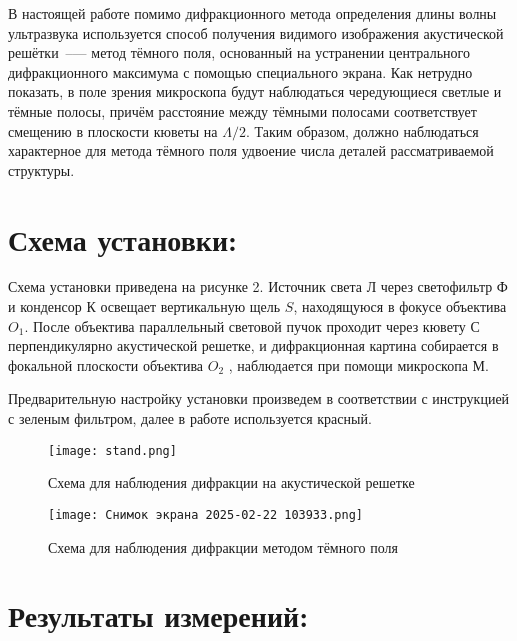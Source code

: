\documentclass[a4paper, 12pt]{article}
\begin{document}
В настоящей работе помимо дифракционного метода определения длины волны ультразвука используется способ получения видимого изображения акустической решётки~--— метод тёмного поля, основанный на устранении центрального дифракционного максимума с помощью специального экрана. Как нетрудно показать, в поле зрения микроскопа будут наблюдаться чередующиеся светлые и тёмные полосы, причём расстояние между тёмными полосами соответствует смещению в плоскости кюветы на $\Lambda/2$. Таким образом, должно наблюдаться характерное для метода тёмного поля удвоение числа деталей рассматриваемой структуры.






\large\section{Схема установки:}
Схема установки приведена на рисунке 2. Источник света Л через светофильтр Ф и конденсор К освещает вертикальную щель $ S $, находящуюся в фокусе объектива $ O_1 $. После объектива параллельный световой пучок проходит через кювету С перпендикулярно акустической решетке, и дифракционная картина собирается в фокальной плоскости объектива $ O_2 $ , наблюдается при помощи микроскопа М.

    Предварительную настройку установки произведем в соответствии с инструкцией с зеленым фильтром, далее в работе используется красный.
    
    	\begin{figure}[h!]
    	\centering	
    	\texttt{[image: stand.png]}
    	\caption{Схема для наблюдения дифракции на акустической решетке}
    	\label{shema1}
    \end{figure}


\begin{figure}[h!]
    	\centering	
    	\texttt{[image: Снимок экрана 2025-02-22 103933.png]}
    	\caption{Схема для наблюдения дифракции методом тёмного поля}
    	\label{shema1}
    \end{figure}





\large\section{Результаты измерений:}
\end{document}
